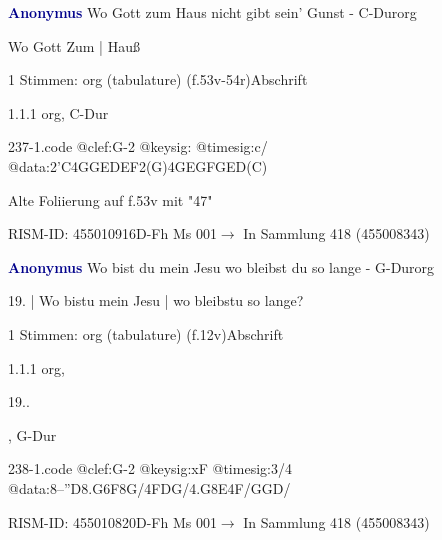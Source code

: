 \documentclass[twocolumn]{book}
\begin{document}
\par \vspace{7pt} \textcolor{darkblue}{\textbf{Anonymus  }}\hfillplus{\textbf{[237]}}\newline Wo Gott zum Haus nicht gibt sein' Gunst - C-Dur\newline org
\par \begin{itshape}[f.53v, at left:] Wo Gott Zum | Hauß\end{itshape} 
\par \textcolor{darkblue}{}  1 Stimmen: org (tabulature)  (f.53v-54r)\newline Abschrift
\par 1.1.1  org, C-Dur  
\begin{filecontents*}{237-1.code}
@clef:G-2
@keysig:
@timesig:c/
@data:2'C4GGEDEF2(G)4GEGFGED(C)
\end{filecontents*}
\newline
%
\par Alte Foliierung auf f.53v mit "47"
\par RISM-ID: 455010916\newline D-Fh  Ms 001\newline $\rightarrow$ In Sammlung 418 (455008343)
      
\par \vspace{7pt} \textcolor{darkblue}{\textbf{Anonymus  }}\hfillplus{\textbf{[238]}}\newline Wo bist du mein Jesu wo bleibst du so lange - G-Dur\newline org
\par \begin{itshape}[f.12v, at left:] 19. | Wo bistu mein Jesu | wo bleibstu so lange?\end{itshape} 
\par \textcolor{darkblue}{}  1 Stimmen: org (tabulature)  (f.12v)\newline Abschrift
\par 1.1.1  org, \begin{itshape}19..\end{itshape}, G-Dur  
\begin{filecontents*}{238-1.code}
@clef:G-2
@keysig:xF
@timesig:3/4
@data:8--''D{8.G6F8G}/4FDG/4.G8E4F/GGD/
\end{filecontents*}
\newline
%
\par RISM-ID: 455010820\newline D-Fh  Ms 001\newline $\rightarrow$ In Sammlung 418 (455008343)
      
\end{document}
